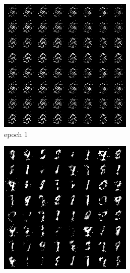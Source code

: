 \documentclass[a4paper]{article}
\theoremstyle{definition}
\newenvironment{soln}{
	\leavevmode\color{blue}\ignorespaces
}{}
\begin{document}
\begin{enumerate} [label=(\alph*)]
\begin{soln}
		\begin{figure}[H]
			\centering
			\begin{subfigure}[b]{0.3\textwidth}
				\centering
				\includegraphics[width=\textwidth]{images/q1a_gen_img1.png}
				\caption{epoch 1}
			\end{subfigure}
			\hfill
			\begin{subfigure}[b]{0.3\textwidth}
				\centering
				\includegraphics[width=\textwidth]{images/q1a_gen_img50.png}

\end{subfigure}
\end{figure}
\end{soln}
\end{enumerate}
\end{document}
